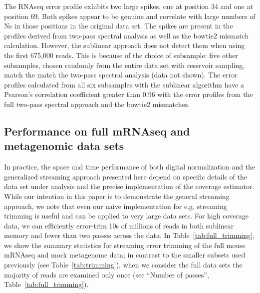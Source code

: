 \documentclass{article}
\begin{document}
The RNAseq error profile exhibits two large spikes, one at position 34
and one at position 69.  Both spikes appear to be genuine and
correlate with large numbers of Ns in those positions in the original
data set.  The spikes are present in the profiles derived from
two-pass spectral analysis as well as the bowtie2 mismatch
calculation.  However, the sublinear approach does not detect them
when using the first 675,000 reads.  This is because of the choice of
subsample: five other subsamples, chosen randomly from the entire data
set with reservoir sampling, match the match the two-pass spectral
analysis (data not shown).  The error profiles calculated from all six
subsamples with the sublinear algorithm have a Pearson's correlation
coefficient greater than 0.96 with the error profiles from the full
two-pass spectral approach and the bowtie2 mismatches.


\subsection{Performance on full mRNAseq and metagenomic data sets}

In practice, the space and time performance of both digital
normalization and the generalized streaming approach presented here
depend on specific details of the data set under analysis and the
precise implementation of the coverage estimator. While our intention
in this paper is to demonstrate the general streaming approach, we
note that even our naive implementation for e.g. streaming trimming is
useful and can be applied to very large data sets.  For high coverage
data, we can efficiently error-trim 10s of millions of reads in both
sublinear memory and fewer than two passes across the data.  In
Table~\ref{tab:full_trimming}, we show the summary statistics for
streaming error trimming of the full mouse mRNAseq and mock metagenome
data; in contrast to the smaller subsets used previously (see
Table~\ref{tab:trimming}), when we consider the full data sets the
majority of reads are examined only once (see ``Number of passes'',
Table~\ref{tab:full_trimming}).


\end{document}
